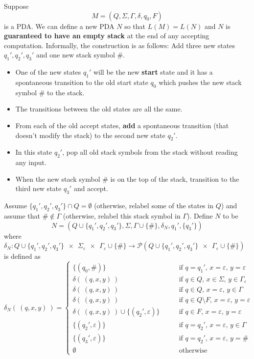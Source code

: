 \begin{enumerate}
    Suppose 
    \[
    M = (Q, \Sigma, \Gamma, \delta, q_0, F)
    \]
    is a PDA.  We can define a new
PDA $N$ so that $L(M) = L(N)$ and $N$ is {\bf guaranteed to have an empty stack} at the 
end of any accepting computation. 
Informally, the construction is as follows: Add three new states $q_1', q_2', q_3'$ and one new
stack symbol $\#$.  
\begin{itemize}
\item One of the new states $q_1'$ will be the new {\bf start} state and it has a spontaneous transition to the old start state $q_0$ which pushes the new stack symbol $\#$ to the stack. 
\item The transitions between the old states are all the same.
\item From each of the old accept states, {\bf add} a spontaneous
transition (that doesn't modify the stack) to the second new state $q_2'$.  
\item In this state $q_2'$, pop all old stack
symbols from the stack without reading any input. 
\item When the new stack symbol $\#$ is on the top of the stack, transition to the third new state $q_3'$ and accept.
\end{itemize}
Assume $\{ q_1', q_2', q_3'\} \cap Q = \emptyset$ (otherwise, relabel 
some of the states in $Q$) and assume that $\# \notin \Gamma$ (otherwise, relabel this stack symbol 
in $\Gamma$).  Define $N$ to be
\[
N = ( Q \cup \{ q_1', q_2', q_3'\} , \Sigma, \Gamma \cup \{\#\}, \delta_N, q_1', \{q_3'\} )
\]
where 
$\delta_N : Q \cup \{ q_1', q_2', q_3'\}~~\times~~ \Sigma_\varepsilon ~~\times~~\Gamma_\varepsilon\cup \{\#\}
\to \mathcal{P}( Q \cup \{ q_1', q_2', q_3'\} ~~\times ~~\Gamma_\varepsilon\cup \{\#\})$  is defined as
\[
\delta_N ( ~(q, x, y)~) = \begin{cases}
\{ (q_0, \#) \} &\qquad \text{if $q = q_1'$, $x = \varepsilon$, $y = \varepsilon$} \\
\delta( ~(q, x, y)~)  & \qquad \text{if $q \in Q$, $x \in \Sigma$, $y \in \Gamma_\varepsilon$} \\
\delta( ~(q, x, y)~)  & \qquad \text{if $q \in Q$, $x=\varepsilon$, $y \in \Gamma$} \\
\delta( ~(q, x, y)~)  & \qquad \text{if $q \in Q  \setminus F$, $x=\varepsilon$, $y =\varepsilon$} \\
\delta( ~(q, x, y)~) \cup \{  (q_2', \varepsilon) \}  & \qquad \text{if $q \in F$, $x=\varepsilon$, $y =\varepsilon$} \\
\{ (q_2', \varepsilon)\} & \qquad \text{if $q = q_2'$, $x = \varepsilon$, $y \in  \Gamma$} \\
\{ (q_3', \varepsilon)\} & \qquad \text{if $q = q_2'$, $x = \varepsilon$, $y = \#$} \\
\emptyset & \qquad \text{otherwise}
\end{cases}
\]


\end{enumerate}

